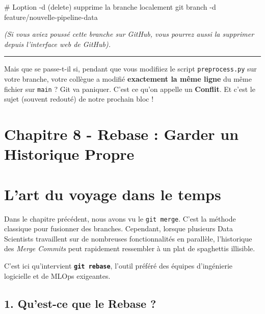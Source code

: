 \documentclass[
  letterpaper,
  DIV=11,
  numbers=noendperiod]{scrreprt}
\newenvironment{Shaded}{\begin{snugshade}}{\end{snugshade}}
\newcommand{\AttributeTok}[1]{\textcolor[rgb]{0.40,0.45,0.13}{#1}}
\newcommand{\CommentTok}[1]{\textcolor[rgb]{0.37,0.37,0.37}{#1}}
\newcommand{\FunctionTok}[1]{\textcolor[rgb]{0.28,0.35,0.67}{#1}}
\newcommand{\NormalTok}[1]{\textcolor[rgb]{0.00,0.23,0.31}{#1}}
\begin{document}
\begin{Shaded}
\begin{Highlighting}[]
\CommentTok{\# L\textquotesingle{}option {-}d (delete) supprime la branche localement}
\FunctionTok{git}\NormalTok{ branch }\AttributeTok{{-}d}\NormalTok{ feature/nouvelle{-}pipeline{-}data}
\end{Highlighting}
\end{Shaded}

\emph{(Si vous aviez poussé cette branche sur GitHub, vous pourrez aussi
la supprimer depuis l'interface web de GitHub).}

\begin{center}\rule{0.5\linewidth}{0.5pt}\end{center}

Mais que se passe-t-il si, pendant que vous modifiiez le script
\texttt{preprocess.py} sur votre branche, votre collègue a modifié
\textbf{exactement la même ligne} du même fichier sur \texttt{main} ?
Git va paniquer. C'est ce qu'on appelle un \textbf{Conflit}. Et c'est le
sujet (souvent redouté) de notre prochain bloc !


\section{Chapitre 8 - Rebase : Garder un Historique
Propre}\label{chapitre-8---rebase-garder-un-historique-propre}


\section{L'art du voyage dans le
temps}\label{lart-du-voyage-dans-le-temps}

Dans le chapitre précédent, nous avons vu le \texttt{git\ merge}. C'est
la méthode classique pour fusionner des branches. Cependant, lorsque
plusieurs Data Scientists travaillent sur de nombreuses fonctionnalités
en parallèle, l'historique des \emph{Merge Commits} peut rapidement
ressembler à un plat de spaghettis illisible.

C'est ici qu'intervient \textbf{\texttt{git\ rebase}}, l'outil préféré
des équipes d'ingénierie logicielle et de MLOps exigeantes.

\subsection{1. Qu'est-ce que le Rebase ?}\label{quest-ce-que-le-rebase}
\end{document}
